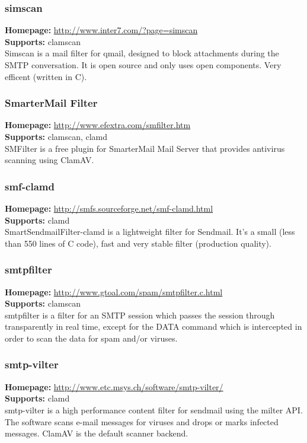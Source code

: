 \documentclass[a4paper,titlepage,12pt]{article}
\begin{document}
    \subsubsection{simscan}
    \textbf{Homepage:} \url{http://www.inter7.com/?page=simscan}\\
    \textbf{Supports:} clamscan\\[4pt]
    Simscan is a mail filter for qmail, designed to block attachments during
    the SMTP conversation. It is open source and only uses open components.
    Very efficent (written in C).

    \subsubsection{SmarterMail Filter}
    \textbf{Homepage:} \url{http://www.efextra.com/smfilter.htm}\\
    \textbf{Supports:} clamscan, clamd\\[4pt]
    SMFilter is a free plugin for SmarterMail Mail Server that provides
    antivirus scanning using ClamAV.

    \subsubsection{smf-clamd}
    \textbf{Homepage:} \url{http://smfs.sourceforge.net/smf-clamd.html}\\
    \textbf{Supports:} clamd\\[4pt]
    SmartSendmailFilter-clamd is a lightweight filter for Sendmail. It's
    a small (less than 550 lines of C code), fast and very stable filter
    (production quality).

    \subsubsection{smtpfilter}
    \textbf{Homepage:} \url{http://www.gtoal.com/spam/smtpfilter.c.html}\\
    \textbf{Supports:} clamscan\\[4pt]
    smtpfilter is a filter for an SMTP session which passes the session through
    transparently in real time, except for the DATA command which is
    intercepted in order to scan the data for spam and/or viruses.

    \subsubsection{smtp-vilter}
    \textbf{Homepage:} \url{http://www.etc.msys.ch/software/smtp-vilter/}\\
    \textbf{Supports:} clamd\\[4pt]
    smtp-vilter is a high performance content filter for sendmail
    using the milter API.  The software scans e-mail messages for
    viruses and drops or marks infected messages. ClamAV is the default
    scanner backend.
\end{document}

